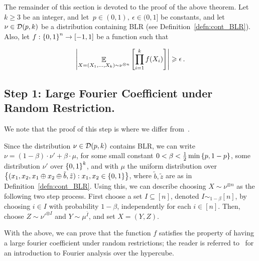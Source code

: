 The remainder of this section is devoted to the proof of the above theorem.
Let $k\geq 3$ be an integer, and let $\ p\in (0,1),\ \epsilon \in (0,1]$ be constants, and let $\nu \in \mathcal D(p,k)$ be a distribution containing BLR (see Definition~\ref{defn:cont_BLR}).
Also, let $f:\left\{ 0,1 \right\}^n\to[-1,1]$ be a function such that

\begin{equation}\label{eqn:test_pass}
	\left|\mathop{\mathbb{E}}_{X=(X_1,\dots,X_k)\sim \nu^{\otimes n}} \left[ \prod_{i=1}^k f(X_i) \right] \right|\geqslant \mathop{\epsilon}.
\end{equation}

\subsection*{Step 1: Large Fourier Coefficient under Random Restriction.}\label{sec:large_fcurr}
We note that the proof of this step is where we differ from~\cite{BKM23b}.

Since the distribution $\nu\in \mathcal D(p,k)$ contains BLR, we can write $\nu = (1-\beta)\cdot \nu' + \beta\cdot \mu$, for some small constant $0<\beta<\frac{1}{2}\min\left\{ p,1-p \right\}$, some distribution $\nu'$ over $\left\{ 0,1 \right\}^k$, and with $\mu$ the uniform distribution over $\left\{ (x_1,x_2,x_1\oplus x_2\oplus \tilde{b},\tilde{z}) : x_1,x_2\in \left\{ 0,1 \right\} \right\}$, where $\tilde{b},\tilde{z}$ are as in Definition~\ref{defn:cont_BLR}.
Using this, we can describe choosing $X \sim \nu^{\otimes n}$ as the following two step process. First choose a set $I\subseteq [n]$, denoted $I\sim_{1-\beta} [n]$, by choosing $i\in I$ with probability $1-\beta$, independently for each $i\in [n]$.
Then, choose $Z\sim \nu'^{\otimes I}$ and $Y\sim \mu^{\bar{I}}$, and set $X = (Y,Z)$.

With the above, we can prove that the function $f$ satisfies the property of having a large fourier coefficient under random restrictions; the reader is referred to~\cite{Don14} for an introduction to Fourier analysis over the hypercube.

